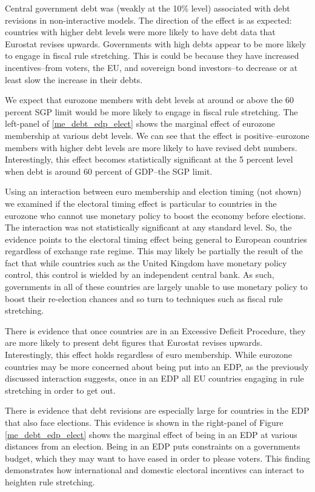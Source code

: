 \documentclass[]{article}
\begin{document}
Central government debt was (weakly at the 10\% level) associated with debt revisions in non-interactive models. The direction of the effect is as expected: countries with higher debt levels were more likely to have debt data that Eurostat revises upwards. Governments with high debts appear to be more likely to engage in fiscal rule stretching. This is could be because they have increased incentives--from voters, the EU, and sovereign bond investors--to decrease or at least slow the increase in their debts.

We expect that eurozone members with debt levels at around or above the 60 percent SGP limit would be more likely to engage in fiscal rule stretching. The left-panel of \ref{me_debt_edp_elect} shows the marginal effect of eurozone membership at various debt levels. We can see that the effect is positive--eurozone members with higher debt levels are more likely to have revised debt numbers. Interestingly, this effect becomes statistically significant at the 5 percent level when debt is around 60 percent of GDP--the SGP limit.

Using an interaction between euro membership and election timing (not shown) we examined if the electoral timing effect is particular to countries in the eurozone who cannot use monetary policy to boost the economy before elections. The interaction was not statistically significant at any standard level. So, the evidence points to the electoral timing effect being general to European countries regardless of exchange rate regime. This may likely be partially the result of the fact that while countries such as the United Kingdom have monetary policy control, this control is wielded by an independent central bank. As such, governments in all of these countries are largely unable to use monetary policy to boost their re-election chances and so turn to techniques such as fiscal rule stretching.

There is evidence that once countries are in an Excessive Deficit Procedure, they are more likely to present debt figures that Eurostat revises upwards. Interestingly, this effect holds regardless of euro membership. While eurozone countries may be more concerned about being put into an EDP, as the previously discussed interaction suggests, once in an EDP all EU countries engaging in rule stretching in order to get out.

There is evidence that debt revisions are especially large for countries in the EDP that also face elections. This evidence is shown in the right-panel of Figure \ref{me_debt_edp_elect} shows the marginal effect of being in an EDP at various distances from an election. Being in an EDP puts constraints on a governments budget, which they may want to have eased in order to please voters. This finding demonstrates how international and domestic electoral incentives can interact to heighten rule stretching.
\end{document}
